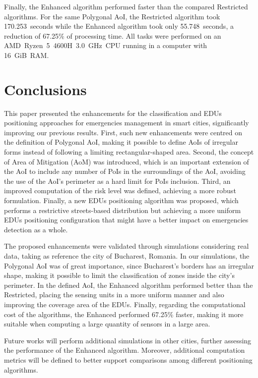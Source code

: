 \begin{refsection}
Finally, the Enhanced algorithm performed faster than the compared Restricted algorithms. For the same Polygonal AoI, the Restricted algorithm took 170.253~seconds while the Enhanced algorithm took only 55.748~seconds, a reduction of 67.25\% of processing time. All tasks were performed on an AMD~Ryzen~5~4600H~3.0~GHz~CPU running in a computer with 16~GiB~RAM.\

\section{Conclusions}\label{sec:conclusion}

This paper presented the enhancements for the classification and EDUs positioning approaches for emergencies management in smart cities, significantly improving our previous results. First, such new enhancements were centred on the definition of Polygonal AoI, making it possible to define AoIs of irregular forms instead of following a limiting rectangular-shaped area. Second, the concept of Area of Mitigation (AoM) was introduced, which is an important extension of the AoI to include any number of PoIs in the surroundings of the AoI, avoiding the use of the AoI's perimeter as a hard limit for PoIs inclusion. Third, an improved computation of the risk level was defined, achieving a more robust formulation. Finally, a new EDUs positioning algorithm was proposed, which performs a restrictive streets-based distribution but achieving a more uniform EDUs positioning configuration that might have a better impact on emergencies detection as a whole. 

The proposed enhancements were validated through simulations considering real data, taking as reference the city of Bucharest, Romania. In our simulations, the Polygonal AoI was of great importance, since Bucharest's borders has an irregular shape, making it possible to limit the classification of zones inside the city's perimeter. In the defined AoI, the Enhanced algorithm performed better than the Restricted, placing the sensing units in a more uniform manner and also improving the coverage area of the EDUs. Finally, regarding the computational cost of the algorithms, the Enhanced performed 67.25\% faster, making it more suitable when computing a large quantity of sensors in a large area. 

Future works will perform additional simulations in other cities, further assessing the performance of the Enhanced algorithm. Moreover, additional computation metrics will be defined to better support comparisons among different positioning algorithms.

\printbibliography[heading=subbibliography]
\end{refsection}
